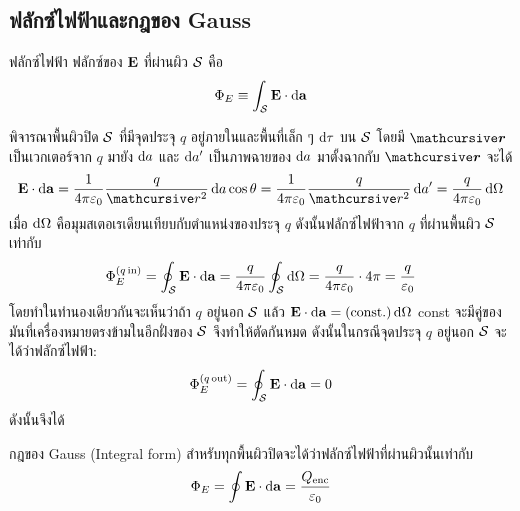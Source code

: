 \subsection{ฟลักซ์ไฟฟ้าและกฎของ Gauss}
\begin{defbox}{ฟลักซ์ไฟฟ้า}
    ฟลักซ์ของ $\mathbf{E}$ ที่ผ่านผิว $\mathcal{S}$ คือ
    \begin{equation}
        \Phi_E\equiv\int_\sur\vb{E}\cdot\odif{\vb{a}}
    \end{equation}
\end{defbox}
พิจารณาพื้นผิวปิด $\mathcal{S}$ ที่มีจุดประจุ $q$ อยู่ภายในและพื้นที่เล็ก ๆ $\odif{\tau}$ บน $\mathcal{S}$ โดยมี $\vbs{\rad}$ เป็นเวกเตอร์จาก $q$ มายัง $\odif{a}$ และ $\odif{a'}$ เป็นภาพฉายของ $\odif{a}$ มาตั้งฉากกับ $\vbs{\rad}$ จะได้
\[ 
\vb{E}\cdot \odif{\vb{a}}=\kem\frac{q}{\rad^2}\odif{a}\cos\theta=\kem\frac{q}{\rad^2}\odif{a'}=\frac{q}{4\pi\eps_0}\odif{\Omega}
\]
เมื่อ $\odif{\Omega}$ คือมุมสเตอเรเดียนเทียบกับตำแหน่งของประจุ $q$ ดังนั้นฟลักซ์ไฟฟ้าจาก $q$ ที่ผ่านพื้นผิว $\mathcal{S}$ เท่ากับ
\begin{equation}
\Phi_E^{(q\,\txt{in})}=\oint_\sur\vb{E}\cdot\odif{\vb{a}}=\frac{q}{4\pi\eps_0}\oint_\sur\odif{\Omega}=\frac{q}{4\pi\eps_0}\cdot4\pi=\frac{q}{\eps_0}
\end{equation}
โดยทำในทำนองเดียวกันจะเห็นว่าถ้า $q$ อยู่นอก $\mathcal{S}$ แล้ว $\vb{E}\cdot\odif{\vb{a}}=(\cst)\odif{\Omega}$ const จะมีคู่ของมันที่เครื่องหมายตรงข้ามในอีกฝั่งของ $\mathcal{S}$ จึงทำให้ตัดกันหมด ดังนั้นในกรณีจุดประจุ $q$ อยู่นอก $\mathcal{S}$ จะได้ว่าฟลักซ์ไฟฟ้า:
\begin{equation}
\Phi_E^{(q\,\txt{out})}=\oint_\sur\vb{E}\cdot\odif{\vb{a}}=0
\end{equation}
ดังนั้นจึงได้
\begin{lawbox}{กฎของ Gauss (Integral form)}
    สำหรับทุกพื้นผิวปิดจะได้ว่าฟลักซ์ไฟฟ้าที่ผ่านผิวนั้นเท่ากับ
    \begin{equation}
        \Phi_E=\oint\vb{E}\cdot\odif{\vb{a}}=\frac{Q_\txt{enc}}{\eps_0}\label{gauss}
    \end{equation}
\end{lawbox}

